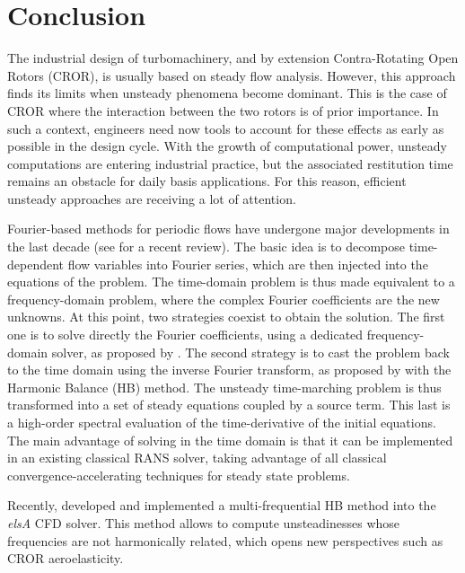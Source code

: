 
\chapter*{Conclusion}

The industrial design of turbomachinery, and by extension Contra-Rotating
Open Rotors (CROR), is usually based on steady flow analysis. 
However, this approach finds its limits 
when unsteady phenomena become dominant. This is the case of 
CROR where the interaction between the
two rotors is of prior importance. In such a
context, engineers need now tools to account for these effects as
early as possible in the design cycle. With the growth of
computational power, unsteady computations are entering industrial
practice, but the associated restitution time remains an obstacle for
daily basis applications. For this reason, efficient
unsteady approaches are receiving a lot of attention. 

Fourier-based methods for periodic flows have undergone major
developments in the last decade (see \citet{He2010} for a recent
review). The basic idea is to decompose
time-dependent flow variables into Fourier series, which are then
injected into the equations of the problem. The time-domain problem is
thus made equivalent to a frequency-domain problem, where the complex
Fourier coefficients are the new unknowns.
At this point, two
strategies coexist to obtain the solution. The first one is to solve
directly the Fourier coefficients, using a dedicated
frequency-domain solver, as proposed by \citet{He1998}. 
The second strategy is to cast the
problem back to the time domain using the inverse Fourier transform, as
proposed by \citet{Hall2002} with the Harmonic
Balance (HB) method. The unsteady time-marching problem is thus
transformed into a set of steady equations coupled by a source term.
This last is a high-order spectral evaluation of the time-derivative of the
initial equations. The main advantage of solving in the time domain is
that it can be implemented in an existing classical RANS solver,
taking advantage of all classical convergence-accelerating techniques
for steady state problems.

Recently, \citet{ThesisGuedeney} developed and implemented a
multi-frequential HB method into the \emph{elsA} CFD solver. 
This method allows to compute unsteadinesses whose frequencies
are not harmonically related, which opens new perspectives
such as CROR aeroelasticity.


